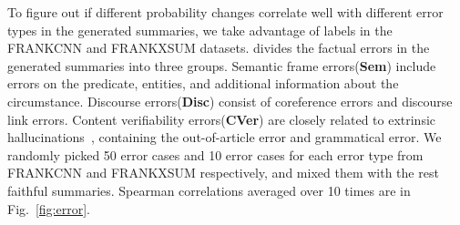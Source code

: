 To figure out if different probability changes correlate well with different error types in the generated summaries, we take advantage of labels in the FRANKCNN and FRANKXSUM datasets. \citet{pagnoni2021understanding} divides the factual errors in the generated summaries into three groups. Semantic frame errors(\textbf{Sem}) include errors on the predicate, entities, and additional information about the circumstance. Discourse errors(\textbf{Disc}) consist of coreference errors and discourse link errors. Content verifiability errors(\textbf{CVer}) are closely related to extrinsic hallucinations~\cite{ji2023survey}, containing the out-of-article error and grammatical error.
We randomly picked 50 error cases and 10 error cases for each error type from FRANKCNN and FRANKXSUM respectively, and mixed them with the rest faithful summaries. Spearman correlations averaged over 10 times are in Fig.~\ref{fig:error}.



